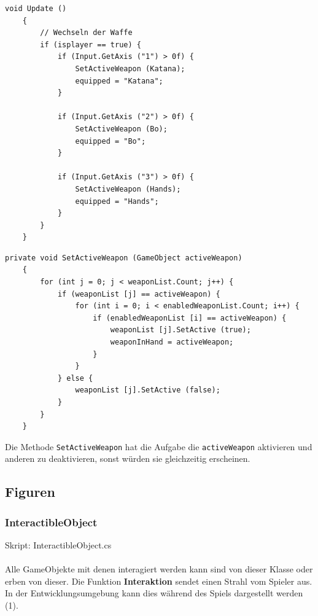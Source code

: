\begin{lstlisting}[caption={Wechsel der Waffen ja nach Taste}]
	void Update ()
	{
		// Wechseln der Waffe
		if (isplayer == true) {
			if (Input.GetAxis ("1") > 0f) {
				SetActiveWeapon (Katana);
				equipped = "Katana";
			}

			if (Input.GetAxis ("2") > 0f) {
				SetActiveWeapon (Bo);
				equipped = "Bo";
			}

			if (Input.GetAxis ("3") > 0f) {
				SetActiveWeapon (Hands);
				equipped = "Hands";
			}
		}
	}
\end{lstlisting}

\begin{lstlisting}[caption={Aktivieren einer Waffe}]
	private void SetActiveWeapon (GameObject activeWeapon)
	{
		for (int j = 0; j < weaponList.Count; j++) {
			if (weaponList [j] == activeWeapon) {
				for (int i = 0; i < enabledWeaponList.Count; i++) {
					if (enabledWeaponList [i] == activeWeapon) {
						weaponList [j].SetActive (true);
						weaponInHand = activeWeapon;
					}
				}
			} else {
				weaponList [j].SetActive (false);
			}
		}
	}
\end{lstlisting}

Die Methode \lstinline{SetActiveWeapon} hat die Aufgabe die \lstinline{activeWeapon} aktivieren und anderen zu deaktivieren, sonst würden sie gleichzeitig erscheinen.

\subsection{Figuren}

\subsubsection{InteractibleObject}
\label{subsubsec:interactibleobject}
Skript: InteractibleObject.cs\\\\
Alle GameObjekte mit denen interagiert werden kann sind von dieser Klasse oder erben von dieser.
Die Funktion \textbf{Interaktion} sendet einen Strahl vom Spieler aus. In der Entwicklungsumgebung kann dies während des Spiels dargestellt werden (1).

